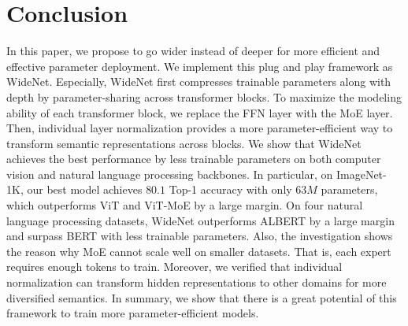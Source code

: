 \documentclass[letterpaper]{article} %
\begin{document}









\section{Conclusion}

In this paper, we propose to go wider instead of deeper for more efficient and effective parameter deployment. We implement this plug and play framework as WideNet. Especially, WideNet first compresses trainable parameters along with depth by parameter-sharing across transformer blocks. To maximize the modeling ability of each transformer block, we replace the FFN layer with the MoE layer. Then, individual layer normalization provides a more parameter-efficient way to transform semantic representations across blocks. We show that WideNet achieves the best performance by less trainable parameters on both computer vision and natural language processing backbones. In particular, on ImageNet-1K, our best model achieves $80.1$ Top-1 accuracy with only $63M$ parameters, which outperforms ViT and ViT-MoE by a large margin. On four natural language processing datasets, WideNet outperforms ALBERT by a large margin and surpass BERT with less trainable parameters. Also, the investigation shows the reason why MoE cannot scale well on smaller datasets. That is, each expert requires enough tokens to train. Moreover, we verified that individual normalization can transform hidden representations to other domains for more diversified semantics. In summary, we show that there is a great potential of this framework to train more parameter-efficient models. 
\end{document}
